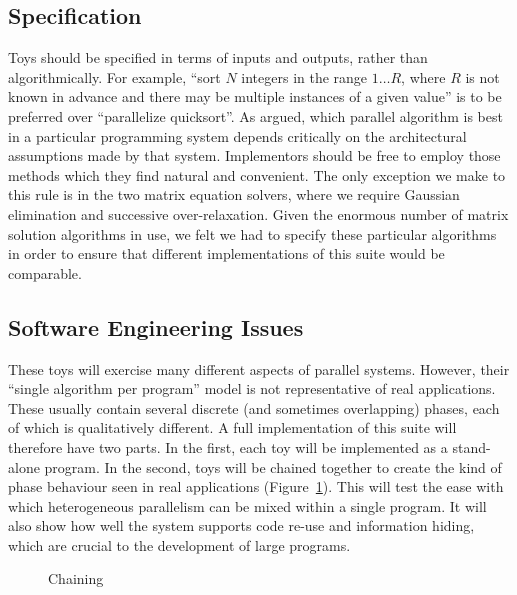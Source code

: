 \subsection{Specification\label{s:method-spec}}

Toys should be specified in terms of inputs and outputs,
rather than algorithmically.
For example,
``sort $N$ integers in the range $1{\ldots}R$,
where $R$ is not known in advance and there may be multiple instances of a given value''
is to be preferred over
``parallelize quicksort''.
As \cite{b:slalom} argued,
which parallel algorithm is best in a particular programming system
depends critically on the architectural assumptions made by that system.
Implementors should be free to employ those methods which they find natural and convenient.
The only exception we make to this rule is in the two matrix equation solvers,
where we require Gaussian elimination and successive over-relaxation.
Given the enormous number of matrix solution algorithms in use,
we felt we had to specify these particular algorithms in order to ensure that
different implementations of this suite would be comparable.

\subsection{Software Engineering Issues\label{s:method-softeng}}

These toys will exercise many different aspects of parallel systems.
However,
their ``single algorithm per program'' model is not representative of real applications.
These usually contain several discrete (and sometimes overlapping) phases,
each of which is qualitatively different.
A full implementation of this suite will therefore have two parts.
In the first,
each toy will be implemented as a stand-alone program.
In the second,
toys will be chained together to create the kind of phase behaviour seen in real applications
(Figure~\ref{f:chaining}).
This will test the ease with which heterogeneous parallelism can be mixed within a single program.
It will also show how well the system supports code re-use and information hiding,
which are crucial to the development of large programs.

\begin{figure}
\epsfxsize=12cm
\begin{center}\mbox{}\end{center}
\caption{Chaining\label{f:chaining}}
\end{figure}

